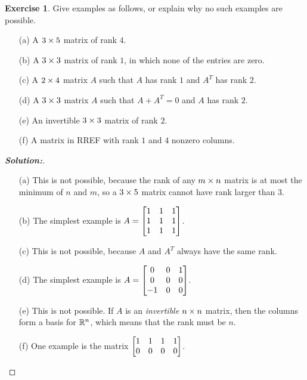 \documentclass[a4paper]{amsart}
\theoremstyle{definition}
\newtheorem{exercise}{Exercise}
\newenvironment{solution}{\begin{proof}[\textbf{Solution:}] \vphantom{u}}{\end{proof}}
\begin{document}
\begin{exercise}\label{ex-rank-ii}
 Give examples as follows, or explain why no such examples are
 possible. 
 \begin{itemize}
  \item[(a)] A $3\times 5$ matrix of rank $4$.
  \item[(b)] A $3\times 3$ matrix of rank $1$, in which none of the
   entries are zero.
  \item[(c)] A $2\times 4$ matrix $A$ such that $A$ has rank $1$ and
   $A^T$ has rank $2$.
  \item[(d)] A $3\times 3$ matrix $A$ such that $A+A^T=0$ and $A$ has
   rank $2$.
  \item[(e)] An invertible $3\times 3$ matrix of rank $2$.
  \item[(f)] A matrix in RREF with rank $1$ and $4$ nonzero columns. 
 \end{itemize}
\end{exercise}
\begin{solution}
 \begin{itemize}
  \item[(a)] This is not possible, because the rank of any $m\times n$
   matrix is at most the minimum of $n$ and $m$, so a $3\times 5$ matrix
   cannot have rank larger than $3$.
  \item[(b)] The simplest example is $A=\left[\begin{matrix} 1&1&1\\1&1&1\\1&1&1\end{matrix}\right]$.
  \item[(c)] This is not possible, because $A$ and $A^T$ always have
   the same rank.
  \item[(d)] The simplest example is $A=\left[\begin{matrix} 0&0&1\\0&0&0\\-1&0&0\end{matrix}\right]$.
  \item[(e)] This is not possible.  If $A$ is an \emph{invertible}
   $n\times n$ matrix, then the columns form a basis for ${\mathbb{R}}^n$, which
   means that the rank must be $n$.
  \item[(f)] One example is the matrix $\left[\begin{matrix} 1&1&1&1 \\ 0&0&0&0\end{matrix}\right]$.
 \end{itemize}
\end{solution}
\end{document}
